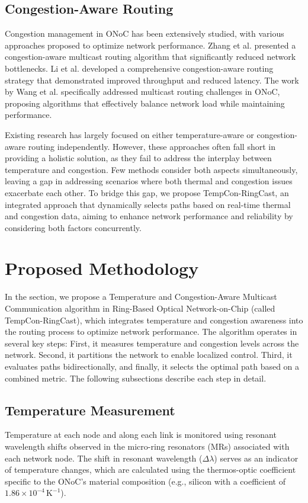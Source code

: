 \documentclass[conference]{IEEEtran}
\begin{document}
\subsection{Congestion-Aware Routing}
Congestion management in ONoC has been extensively studied, with various approaches proposed to optimize network performance. Zhang et al. \cite{zhang2019congestion} presented a congestion-aware multicast routing algorithm that significantly reduced network bottlenecks. Li et al. \cite{li2018congestion} developed a comprehensive congestion-aware routing strategy that demonstrated improved throughput and reduced latency. The work by Wang et al. \cite{wang2019multicast} specifically addressed multicast routing challenges in ONoC, proposing algorithms that effectively balance network load while maintaining performance.

Existing research has largely focused on either temperature-aware or congestion-aware routing independently. However, these approaches often fall short in providing a holistic solution, as they fail to address the interplay between temperature and congestion. Few methods consider both aspects simultaneously, leaving a gap in addressing scenarios where both thermal and congestion issues exacerbate each other. To bridge this gap, we propose TempCon-RingCast, an integrated approach that dynamically selects paths based on real-time thermal and congestion data, aiming to enhance network performance and reliability by considering both factors concurrently.

\section{Proposed Methodology}
In the section, we propose a Temperature and Congestion-Aware Multicast Communication algorithm in Ring-Based Optical Network-on-Chip (called TempCon-RingCast), which integrates temperature and congestion awareness into the routing process to optimize network performance. The algorithm operates in several key steps: First, it measures temperature and congestion levels across the network. Second, it partitions the network to enable localized control. Third, it evaluates paths bidirectionally, and finally, it selects the optimal path based on a combined metric. The following subsections describe each step in detail.

\subsection{Temperature Measurement}
Temperature at each node and along each link is monitored using resonant wavelength shifts observed in the micro-ring resonators (MRs) \cite{bc972821a43d4cf989b222e9cdc15a79} associated with each network node. The shift in resonant wavelength (\(\Delta \lambda\)) serves as an indicator of temperature changes, which are calculated using the thermos-optic coefficient specific to the ONoC's material composition (e.g., silicon with a coefficient of \(1.86 \times 10^{-4} \, \mathrm{K}^{-1}\)).
\end{document}
